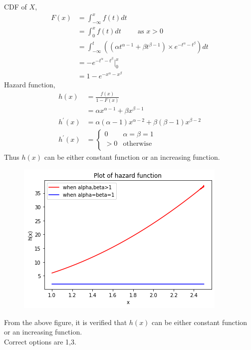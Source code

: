

CDF of $X$, 
\begin{align}
    F(x) &=  \int_{-\infty}^xf(t)dt \\
    &= \int_{0}^xf(t)dt \hspace{1cm} \text{as } x>0\\
    &= \int_{-\infty}^t\left((\alpha t^{\alpha -1} + \beta t^{\beta-1} ) \times e^{-t^{\alpha}-t^{\beta}}\right)dt \\
    &= -e^{-t^{\alpha}-t^{\beta}} \Big|_0^x\\
    &= 1-e^{-x^{\alpha}-x^{\beta}}
\end{align}
Hazard function,
\begin{align}
    h(x) &= \frac{f(x)}{1-F(x)} \\
    &= \alpha x^{\alpha -1} + \beta x^{\beta-1} \\
    h^{\prime}(x) &= \alpha(\alpha -1) x^{\alpha -2} + \beta(\beta-1) x^{\beta-2}\\
     h^{\prime}(x) &= 
         \begin{cases}
    0 & \alpha=\beta=1 \\
    >0 & \text{otherwise}\\
    \end{cases}
    \end{align}
    Thus $h(x)$ can be either constant function or an increasing function.
    
    \begin{figure}[h]
    \includegraphics[width=\columnwidth]{solutions/2018/dec/118/figures/plot.png}
    \end{figure}
     From the above figure, it is verified that $h(x)$ can be either constant function or an increasing function.\\
       Correct options are 1,3.




